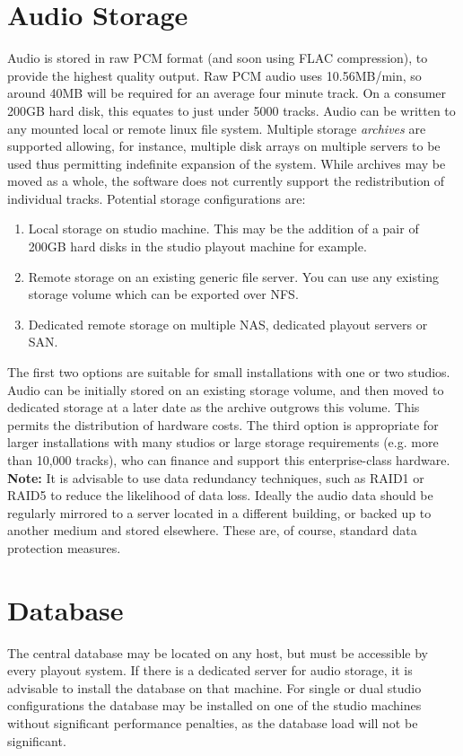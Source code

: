 \documentclass[a4paper,12pt]{report}
\numberwithin{equation}{section}
\begin{document}
\section{Audio Storage}
Audio is stored in raw PCM format (and soon using FLAC compression), to provide the highest quality output. Raw PCM audio uses 10.56MB/min, so around 40MB will be required for an average four minute track. On a consumer 200GB hard disk, this equates to just under 5000 tracks. Audio can be written to any mounted local or remote linux file system. Multiple storage \emph{archives} are supported allowing, for instance, multiple disk arrays on multiple servers to be used thus permitting indefinite expansion of the system. While archives may be moved as a whole, the software does not currently support the redistribution of individual tracks. Potential storage configurations are:
\begin{enumerate}
\item Local storage on studio machine. This may be the addition of a pair of 200GB hard disks in the studio playout machine for example.
\item Remote storage on an existing generic file server. You can use any existing storage volume which can be exported over NFS.
\item Dedicated remote storage on multiple NAS, dedicated playout servers or SAN.
\end{enumerate}
The first two options are suitable for small installations with one or two studios. Audio can be initially stored on an existing storage volume, and then moved to dedicated storage at a later date as the archive outgrows this volume. This permits the distribution of hardware costs. The third option is appropriate for larger installations with many studios or large storage requirements (e.g. more than 10,000 tracks), who can finance and support this enterprise-class hardware.
\textbf{Note:} It is advisable to use data redundancy techniques, such as RAID1 or RAID5 to reduce the likelihood of data loss. Ideally the audio data should be regularly mirrored to a server located in a different building, or backed up to another medium and stored elsewhere. These are, of course, standard data protection measures.

\section{Database}
The central database may be located on any host, but must be accessible by every playout system. If there is a dedicated server for audio storage, it is advisable to install the database on that machine. For single or dual studio configurations the database may be installed on one of the studio machines without significant performance penalties, as the database load will not be significant.
\end{document}
